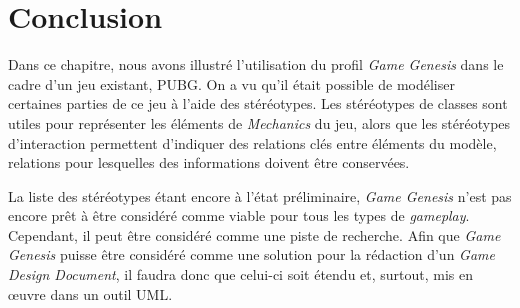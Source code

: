 \section{Conclusion}


Dans ce chapitre, nous avons illustré l'utilisation du profil \emph{Game Genesis} dans le cadre d'un jeu existant, PUBG.
On a vu qu'il était possible de modéliser certaines parties de ce jeu à l'aide des stéréotypes.
Les stéréotypes de classes sont utiles pour représenter les éléments de \emph{Mechanics} du jeu, alors
que
les stéréotypes d'interaction permettent d'indiquer des relations clés entre éléments du modèle, relations pour lesquelles des informations doivent être conservées.

La liste des stéréotypes étant encore à l'état préliminaire, \emph{Game Genesis} n'est pas encore prêt à être considéré comme viable pour tous les types de \emph{gameplay}. Cependant, il peut être considéré comme une piste de recherche.
Afin que \emph{Game Genesis} puisse être considéré comme une solution pour la rédaction d'un \emph{Game Design Document}, il faudra donc que celui-ci soit étendu et, surtout, mis en \oe{}uvre dans un outil UML.
